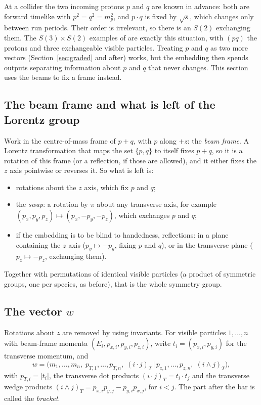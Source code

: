 \documentclass[11pt]{article}
\theoremstyle{definition}
\theoremstyle{remark}
\begin{document}
At a collider the two incoming protons $p$ and $q$ are known in advance: both
are forward timelike with $p^2 = q^2 = m_p^2$, and $p\cdot q$ is fixed by
$\sqrt{s}$, which changes only between run periods. Their order is irrelevant,
so there is an $S(2)$ exchanging them. The $S(3)\times S(2)$ examples of
\cite{GHL20,LHG22} are exactly this situation, with $(pq)$ the protons and three
exchangeable visible particles. Treating $p$ and $q$ as two more vectors
(Section~\ref{sec:graded} and after) works, but the embedding then spends outputs
separating information about $p$ and $q$ that never changes. This section uses
the beams to fix a frame instead.

\subsection{The beam frame and what is left of the Lorentz group}

Work in the centre-of-mass frame of $p + q$, with $p$ along $+z$: the
\emph{beam frame}. A Lorentz transformation that maps the set $\{p, q\}$ to
itself fixes $p + q$, so it is a rotation of this frame (or a reflection, if
those are allowed), and it either fixes the $z$ axis pointwise or reverses it.
So what is left is:
\begin{itemize}
  \item rotations about the $z$ axis, which fix $p$ and $q$;
  \item the \emph{swap}: a rotation by $\pi$ about any transverse axis, for
    example $(p_x, p_y, p_z) \mapsto (p_x, -p_y, -p_z)$, which exchanges $p$
    and $q$;
  \item if the embedding is to be blind to handedness, reflections: in a plane
    containing the $z$ axis ($p_y \mapsto -p_y$, fixing $p$ and $q$), or in
    the transverse plane ($p_z \mapsto -p_z$, exchanging them).
\end{itemize}
Together with permutations of identical visible particles (a product of
symmetric groups, one per species, as before), that is the whole symmetry
group.

\subsection{The vector $w$}

Rotations about $z$ are removed by using invariants. For visible particles
$1, \ldots, n$ with beam-frame momenta $(E_i, p_{x,i}, p_{y,i}, p_{z,i})$, write
$t_i = (p_{x,i}, p_{y,i})$ for the transverse momentum, and
\[
  w = \bigl( m_1, \ldots, m_n,\; p_{T,1}, \ldots, p_{T,n},\;
      (i\cdot j)_T \,\big|\, p_{z,1}, \ldots, p_{z,n},\; (i\wedge j)_T \bigr),
\]
with $p_{T,i} = |t_i|$, the transverse dot products $(i\cdot j)_T = t_i \cdot
t_j$ and the transverse wedge products $(i\wedge j)_T = p_{x,i}p_{y,j} -
p_{y,i}p_{x,j}$, for $i < j$. The part after the bar is called the
\emph{bracket}.
\end{document}
